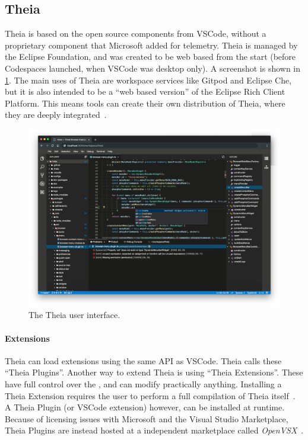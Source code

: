 \subsection{Theia}

Theia is based on the \gls{open source} components from \gls{VSCode}, without a proprietary component that Microsoft added for telemetry.
Theia is managed by the Eclipse Foundation, and was created to be web based from the start (before Codespaces launched, when \gls{VSCode} was desktop only).
A screenshot is shown in \cref{fig:theia-ui}.
The main uses of Theia are workspace services like \gls{Gitpod} and Eclipse Che, but it is also intended to be a ``web based version'' of the Eclipse Rich Client Platform.
This means tools can create their own distribution of Theia, where they are deeply integrated~\cite{helmingEclipseTheiaIDE2019a}.

\begin{figure}[htbp]  %
  \centering
  \includegraphics[width=\textwidth]{figures/pre-project/theia-screenshot.png}
  \caption[Theia User Interface]{The \gls{Theia} user interface.}\label{fig:theia-ui}
\end{figure}

\paragraph{Extensions}
Theia can load extensions using the same \acrfull{API} as \gls{VSCode}.
Theia calls these ``Theia Plugins''.
Another way to extend Theia is using ``Theia Extensions''.
These have full control over the , and can modify practically anything.
Installing a Theia Extension requires the user to perform a full compilation of \gls{Theia} itself~\cite{helmingHowAddExtensions2019}.
A Theia Plugin (or \gls{VSCode} extension) however, can be installed at runtime.
Because of licensing issues with Microsoft and the Visual Studio Marketplace, Theia Plugins are instead hosted at a independent marketplace called \textit{OpenVSX}~\cite{svenefftingeOpenVSX2020}.